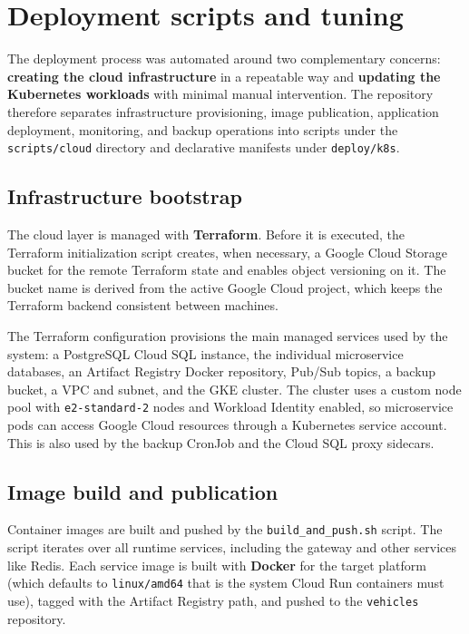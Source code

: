 \chapter{Deployment scripts and tuning} \label{cap:deployment}

The deployment process was automated around two complementary concerns: \textbf{creating the cloud infrastructure} in a repeatable way and \textbf{updating the Kubernetes workloads} with minimal manual intervention. The repository therefore separates infrastructure provisioning, image publication, application deployment, monitoring, and backup operations into scripts under the \texttt{scripts/cloud} directory and declarative manifests under \texttt{deploy/k8s}.

\section{Infrastructure bootstrap}

The cloud layer is managed with \textbf{Terraform}. Before it is executed, the Terraform initialization script creates, when necessary, a Google Cloud Storage bucket for the remote Terraform state and enables object versioning on it. The bucket name is derived from the active Google Cloud project, which keeps the Terraform backend consistent between machines.

The Terraform configuration provisions the main managed services used by the system: a PostgreSQL Cloud SQL instance, the individual microservice databases, an Artifact Registry Docker repository, Pub/Sub topics, a backup bucket, a VPC and subnet, and the GKE cluster. The cluster uses a custom node pool with \texttt{e2-standard-2} nodes and Workload Identity enabled, so microservice pods can access Google Cloud resources through a Kubernetes service account. This is also used by the backup CronJob and the Cloud SQL proxy sidecars.

\section{Image build and publication}

Container images are built and pushed by the \texttt{build\_and\_push.sh} script. The script iterates over all runtime services, including the gateway and other services like Redis. Each service image is built with \textbf{Docker} for the target platform (which defaults to \texttt{linux/amd64} that is the system Cloud Run containers must use), tagged with the Artifact Registry path, and pushed to the \texttt{vehicles} repository.

